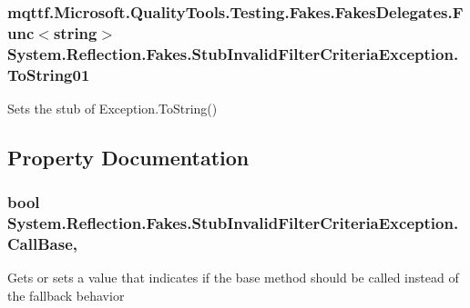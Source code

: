 \hypertarget{class_system_1_1_reflection_1_1_fakes_1_1_stub_invalid_filter_criteria_exception_a23aa16da11b2bb401d10a206657e9b7e}{
\subsubsection[{To\-String01}]{\setlength{\rightskip}{0pt plus 5cm}mqttf.\-Microsoft.\-Quality\-Tools.\-Testing.\-Fakes.\-Fakes\-Delegates.\-Func$<$string$>$ System.\-Reflection.\-Fakes.\-Stub\-Invalid\-Filter\-Criteria\-Exception.\-To\-String01}}\label{class_system_1_1_reflection_1_1_fakes_1_1_stub_invalid_filter_criteria_exception_a23aa16da11b2bb401d10a206657e9b7e}


Sets the stub of Exception.\-To\-String()



\subsection{Property Documentation}
\hypertarget{class_system_1_1_reflection_1_1_fakes_1_1_stub_invalid_filter_criteria_exception_ab2836726a8966ebee0e42ee00d982e06}{
\subsubsection[{Call\-Base}]{\setlength{\rightskip}{0pt plus 5cm}bool System.\-Reflection.\-Fakes.\-Stub\-Invalid\-Filter\-Criteria\-Exception.\-Call\-Base\hspace{0.3cm}{\ttfamily [get]}, {\ttfamily [set]}}}\label{class_system_1_1_reflection_1_1_fakes_1_1_stub_invalid_filter_criteria_exception_ab2836726a8966ebee0e42ee00d982e06}


Gets or sets a value that indicates if the base method should be called instead of the fallback behavior

